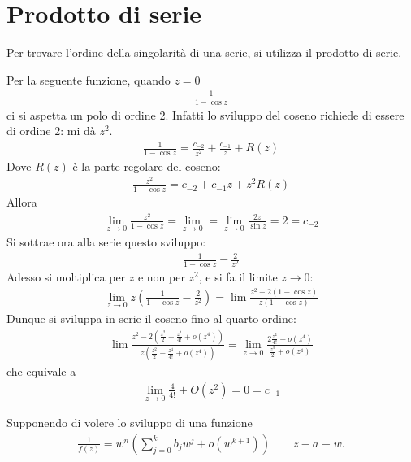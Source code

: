 \documentclass[a4paper, oneside]{article}
\begin{document}
\section{Prodotto di serie}
Per trovare l'ordine della singolarità di una serie, si utilizza il prodotto 
di serie. 
\begin{example}
    Per la seguente funzione, quando $z = 0$
    \begin{gather*}
        \frac{1}{1 - \cos z}
    \end{gather*}
    ci si aspetta un polo di ordine 2. Infatti lo sviluppo del coseno 
    richiede di essere di ordine 2: mi dà $z^{2}$. 
    \begin{gather*}
        \frac{1}{1 - \cos z} = \frac{c_{-2}}{z^{2}} + \frac{c_{-1}}{z} + R(z)
    \end{gather*}
    Dove $R(z)$ è la parte regolare del coseno:
    \begin{gather*}
        \frac{z^{2}}{1 - \cos z} = c_{-2} + c_{-1}z + z^{2}R(z)
    \end{gather*}
    Allora 
    \begin{gather*}
        \lim_{z \to 0} \frac{z^{2}}{1 - \cos z} = \lim_{z \to 0} = \lim_{z \to 0} \frac{2z}{\sin z} = 2 = c_{-2}   
    \end{gather*}
    Si sottrae ora alla serie questo sviluppo:
    \begin{gather*}
        \frac{1}{1 - \cos z} - \frac{2}{z^{2}} 
    \end{gather*}
    Adesso si moltiplica per $z$ e non per $z^{2}$, e si fa il limite $z \to 0$: 
    \begin{gather*}
        \lim_{z \to 0} z\left(\frac{1}{1 - \cos z} - \frac{2}{z^{2}}\right) = \lim \frac{z^{2} - 2(1 - \cos z)}{z(1 - \cos z)}  
    \end{gather*}
    Dunque si sviluppa in serie il coseno fino al quarto ordine: 
    \begin{gather*}
        \lim \frac{z^{2} - 2\left(\frac{z^{2}}{2}  - \frac{z^{4}}{4!} + o(z^{4})\right) }{z\left(\frac{z^{2}}{2} - \frac{z^{4}}{4!} + o(z^{4})\right)} = \lim_{z \to 0} \frac{2\frac{z^{4}}{4!} + o(z^{4})}{\frac{z^{3}}{2} + o(z^{4})} 
    \end{gather*}
    che equivale a 
    \begin{gather*}
        \lim_{ z\to 0} \frac{4}{4!} + O(z^{2}) = 0 = c_{-1} 
    \end{gather*}
\end{example}
Supponendo di volere lo sviluppo di una funzione  
\begin{gather*}
    \frac{1}{f(z)} = w^{n}\left(\sum_{j = 0}^{k} b_jw^{j} + o(w^{k + 1}) \right) \qquad z - a \equiv w.
\end{gather*}
\end{document}
